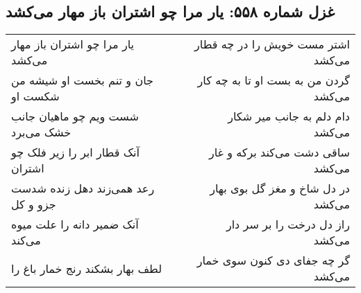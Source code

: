 \begin{center}
\section*{غزل شماره ۵۵۸: یار مرا چو اشتران باز مهار می‌کشد}
\label{sec:0558}
\begin{longtable}{l p{0.5cm} r}
یار مرا چو اشتران باز مهار می‌کشد
&&
اشتر مست خویش را در چه قطار می‌کشد
\\
جان و تنم بخست او شیشه من شکست او
&&
گردن من به بست او تا به چه کار می‌کشد
\\
شست ویم چو ماهیان جانب خشک می‌برد
&&
دام دلم به جانب میر شکار می‌کشد
\\
آنک قطار ابر را زیر فلک چو اشتران
&&
ساقی دشت می‌کند برکه و غار می‌کشد
\\
رعد همی‌زند دهل زنده شدست جزو و کل
&&
در دل شاخ و مغز گل بوی بهار می‌کشد
\\
آنک ضمیر دانه را علت میوه می‌کند
&&
راز دل درخت را بر سر دار می‌کشد
\\
لطف بهار بشکند رنج خمار باغ را
&&
گر چه جفای دی کنون سوی خمار می‌کشد
\\
\end{longtable}
\end{center}
